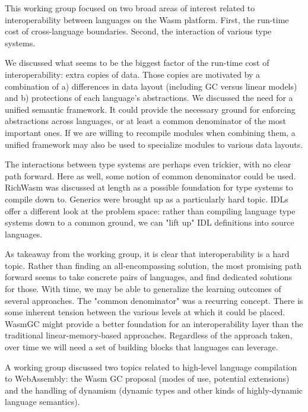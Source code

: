 \documentclass[a4paper,UKenglish]{dagrep-v2018}
\begin{document}
This working group focused on two broad areas of interest related to interoperability between languages on the Wasm platform. First, the run-time cost of cross-language boundaries. Second, the interaction of various type systems.

We discussed what seems to be the biggest factor of the run-time cost of interoperability: extra copies of data. Those copies are motivated by a combination of a) differences in data layout (including GC versus linear models) and b) protections of each language's abstractions. We discussed the need for a unified semantic framework. It could provide the necessary ground for enforcing abstractions across languages, or at least a common denominator of the most important ones. If we are willing to recompile modules when combining them, a unified framework may also be used to specialize modules to various data layouts.

The interactions between type systems are perhaps even trickier, with no clear path forward. Here as well, some notion of common denominator could be used. RichWasm was discussed at length as a possible foundation for type systems to compile down to. Generics were brought up as a particularly hard topic. IDLs offer a different look at the problem space: rather than compiling language type systems down to a common ground, we can "lift up" IDL definitions into source languages.

As takeaway from the working group, it is clear that interoperability is a hard topic. Rather than finding an all-encompassing solution, the most promising path forward seems to take concrete pairs of languages, and find dedicated solutions for those. With time, we may be able to generalize the learning outcomes of several approaches. The "common denominator" was a recurring concept. There is some inherent tension between the various levels at which it could be placed. WasmGC might provide a better foundation for an interoperability layer than the traditional linear-memory-based approaches. Regardless of the approach taken, over time we will need a set of building blocks that languages can leverage.

\license

A working group discussed two topics related to high-level language compilation
to WebAssembly: the Wasm GC proposal (modes of use, potential extensions) and
the handling of dynamism (dynamic types and other kinds of highly-dynamic
language semantics).
\end{document}
